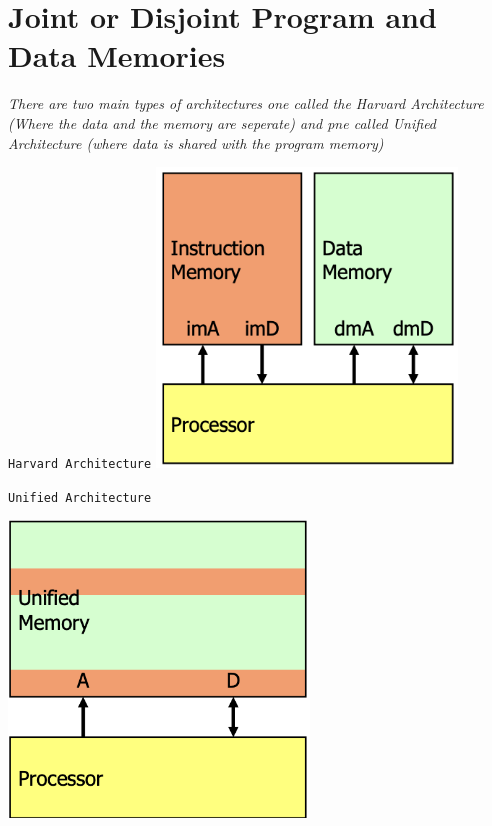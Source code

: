 \section{Joint or Disjoint Program and Data Memories}
\textit{There are two main types of architectures one called the Harvard Architecture (Where the data and the memory are seperate) and pne called Unified Architecture (where data is shared with the program memory)} \newline
\vspace*{5px}
\begin{minipage}[htp]{0.4\textwidth}
    \texttt{Harvard Architecture} \newline
    \vspace*{2px}
    \centering
    \includegraphics[width=0.6\textwidth]{chapters/chapter1/images/harvard.png}
\end{minipage}
\hfill
\vline
\hfill
\begin{minipage}[htp]{0.4\textwidth}
    \texttt{Unified Architecture} \newline    
    \vspace*{2px}

    \centering
    \includegraphics[width=0.6\textwidth]{chapters/chapter1/images/unified.png}
\end{minipage}
\newpage
